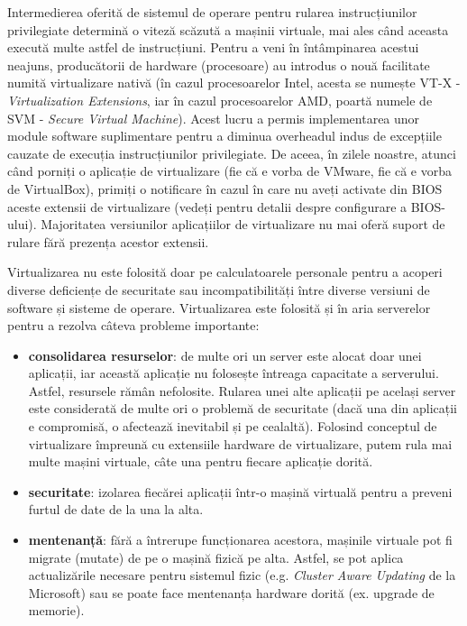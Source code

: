 Intermedierea oferită de sistemul de operare pentru rularea instrucțiunilor privilegiate
determină o viteză scăzută a mașinii virtuale, mai ales când aceasta
execută multe astfel de instrucțiuni. Pentru a veni în întâmpinarea acestui
neajuns, producătorii de hardware (procesoare) au introdus o nouă facilitate
numită virtualizare nativă (în cazul procesoarelor Intel, acesta se numește VT-X
- \textit{Virtualization Extensions}, iar în cazul procesoarelor AMD, poartă numele de SVM
- \textit{Secure Virtual Machine}). Acest lucru a permis implementarea unor module
software suplimentare pentru a diminua overheadul indus de excepțiile cauzate
de execuția instrucțiunilor privilegiate. De aceea, în zilele noastre, atunci
când porniți o aplicație de virtualizare (fie că e vorba de VMware, fie că e
vorba de VirtualBox), primiți o notificare în cazul în care nu aveți activate din BIOS
aceste extensii de virtualizare (vedeți 
pentru detalii despre configurare a BIOS-ului). Majoritatea versiunilor
aplicațiilor de virtualizare nu mai oferă suport de rulare fără prezența acestor
extensii.

Virtualizarea nu este folosită doar pe calculatoarele personale pentru a acoperi
diverse deficiențe de securitate sau incompatibilități între diverse versiuni de
software și sisteme de operare. Virtualizarea este folosită și în aria
serverelor pentru a rezolva câteva probleme importante:

\begin{itemize}
  \item \textbf{consolidarea resurselor}: de multe ori un server este alocat doar
		unei aplicații, iar această aplicație nu folosește întreaga
		capacitate a serverului. Astfel, resursele rămân nefolosite.
		Rularea unei alte aplicații pe același server este considerată
		de multe ori o problemă de securitate (dacă una din aplicații e
		compromisă, o afectează inevitabil și pe cealaltă). Folosind
		conceptul de virtualizare împreună cu extensiile hardware de
		virtualizare, putem rula mai multe mașini virtuale, câte una
		pentru fiecare aplicație dorită.
  \item \textbf{securitate}: izolarea fiecărei aplicații într-o mașină virtuală
		pentru a preveni furtul de date de la una la alta.
  \item \textbf{mentenanță}: fără a întrerupe funcționarea acestora,
		mașinile virtuale pot fi migrate (mutate) de pe o mașină fizică
		pe alta. Astfel, se pot aplica actualizările necesare pentru
		sistemul fizic (e.g. \textit{Cluster Aware Updating} de la
		Microsoft) sau se poate face mentenanța hardware dorită (ex.
		upgrade de memorie).
\end{itemize}

